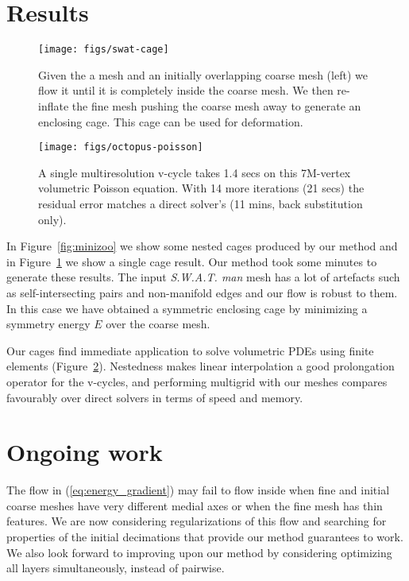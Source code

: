 \documentclass{cgyrf15}
\begin{document}
\section{Results}

\begin{figure}[t]
  \texttt{[image: figs/swat-cage]}
  \caption{Given the a mesh and an initially overlapping coarse mesh (left)
  we flow it until it is completely inside the coarse mesh. We then re-inflate the fine 
  mesh pushing the coarse mesh away to generate an enclosing cage. This cage
  can be used for deformation.}
  \label{fig:swat}
\end{figure}

\begin{figure}[t]
  \texttt{[image: figs/octopus-poisson]}
  \caption{A single multiresolution v-cycle takes 1.4 secs on this 7M-vertex volumetric Poisson equation. With 14 more iterations (21 secs) the residual error matches a direct solver's (11 mins, back substitution only).}
  \label{fig:octopus}
\end{figure}

In Figure~\ref{fig:minizoo} we show some nested cages produced by our method and in Figure~\ref{fig:swat} we show a single cage result. Our method took some minutes to generate these results. The input \emph{S.W.A.T. man} mesh has a lot of artefacts such as self-intersecting pairs and non-manifold edges and our flow is robust to them. In this case we have obtained a symmetric enclosing cage by minimizing a symmetry energy $E$ over the coarse mesh.

Our cages find immediate application to solve volumetric PDEs using finite elements (Figure~\ref{fig:octopus}). Nestedness makes linear interpolation a good prolongation operator for the v-cycles, and performing multigrid with our meshes compares favourably over direct solvers in terms of speed and memory.

\section{Ongoing work}

The flow in (\ref{eq:energy_gradient}) may fail to flow inside when fine and initial coarse meshes have very different medial axes or when the fine mesh has thin features. We are now considering regularizations of this flow and searching for properties of the initial decimations that provide our method guarantees to work. We also look forward to improving upon our method by considering optimizing all layers simultaneously, instead of pairwise.



 
\end{document}
